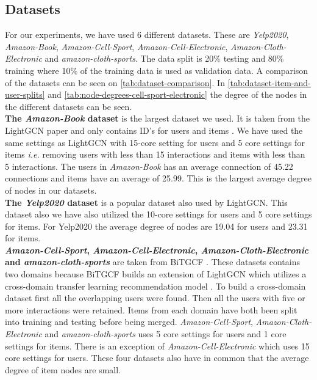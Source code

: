 \subsection{Datasets}
For our experiments, we have used 6 different datasets.
These are \textit{Yelp2020}, \textit{Amazon-Book}, \textit{Amazon-Cell-Sport}, \textit{Amazon-Cell-Electronic}, \textit{Amazon-Cloth-Electronic} and \textit{amazon-cloth-sports}.
The data split is 20\% testing and 80\% training where 10\% of the training data is used as validation data.
A comparison of the datasets can be seen on \autoref{tab:dataset-comparison}.
In \autoref{tab:dataset-item-and-user-splits} and \autoref{tab:node-degrees-cell-sport-electronic} the degree of the nodes in the different datasets can be seen.
\\
\textbf{The \textit{Amazon-Book} dataset} is the largest dataset we used.
It is taken from the LightGCN paper and only contains ID's for users and items \cite{lightgcn}.
We have used the same settings as LightGCN with 15-core setting for users and 5 core settings for items \textit{i.e.} removing users with less than 15 interactions and items with less than 5 interactions.
The users in \textit{Amazon-Book} has an average connection of 45.22 connections and items have an average of 25.99.
This is the largest average degree of nodes in our datasets.
\\
\textbf{The \textit{Yelp2020} dataset} is a popular dataset also used by LightGCN.
This dataset also we have also utilized the 10-core settings for users and 5 core settings for items.
For Yelp2020 the average degree of nodes are 19.04 for users and 23.31 for items.
\\
\textbf{\textit{Amazon-Cell-Sport}, \textit{Amazon-Cell-Electronic}, \textit{Amazon-Cloth-Electronic} and \textit{amazon-cloth-sports}} are taken from BiTGCF \cite{BiTGCF}.
These datasets contains two domains because BiTGCF builds an extension of LightGCN which utilizes a cross-domain transfer learning recommendation model \cite{BiTGCF}.
To build a cross-domain dataset first all the overlapping users were found.
Then all the users with five or more interactions were retained.
Items from each domain have both been split into training and testing before being merged.
\textit{Amazon-Cell-Sport}, \textit{Amazon-Cloth-Electronic} and \textit{amazon-cloth-sports} uses 5 core settings for users and 1 core settings for items.
There is an exception of \textit{Amazon-Cell-Electronic} which uses 15 core settings for users.
These four datasets also have in common that the average degree of item nodes are small.
